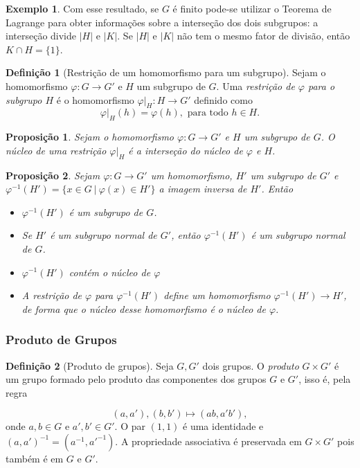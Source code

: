 \documentclass[a4paper,12pt]{report}
\theoremstyle{plain}
\newtheorem{proposicao}{Proposição}[section]
\theoremstyle{definition}
\newtheorem{definicao}{Definição}[section]
\newtheorem{exemplo}{Exemplo}[section]
\begin{document}
	\begin{exemplo}
		Com esse resultado, se \(G\) é finito pode-se utilizar o
		Teorema de Lagrange para obter informações sobre a interseção dos dois
		subgrupos: a interseção divide \(|H|\) e \(|K|\). Se \(|H|\) e \(|K|\)
		não tem o mesmo fator de divisão, então \(K\cap H = \{1\}\).	
	\end{exemplo}
	
	\begin{definicao}[Restrição de um homomorfismo para um subgrupo]
		Sejam o homomorfismo \(\varphi:G\longrightarrow G'\)
		e \(H\) um subgrupo de \(G\). Uma \emph{restrição de \(\varphi\) para o subgrupo \(H\)} é o homomorfismo \(\varphi|_H:H\longrightarrow G'\)
		definido como
		\[\varphi|_H(h) = \varphi(h), \text{ para todo }h\in H.\]	
	\end{definicao}
	
	\begin{proposicao}
		Sejam o homomorfismo
		\(\varphi:G\longrightarrow G'\) e \(H\) um subgrupo de \(G\). O núcleo
		de uma restrição \(\varphi|_H\) é a interseção do núcleo de \(\varphi\)
		e \(H\).	
	\end{proposicao}
	
	\begin{proposicao}
		 Sejam \(\varphi:G\longrightarrow G'\) um
		homomorfismo, \(H'\) um subgrupo de \(G'\) e
		\(\varphi^{-1}(H') = \{x \in G \ | \ \varphi(x) \in H'\}\) a imagem
		inversa de \(H'\). Então
		\begin{itemize}
			\item \(\varphi^{-1}(H')\) é um subgrupo de \(G\).
			\item Se \(H'\) é um subgrupo normal de \(G'\), então \(\varphi^{-1}(H')\) é
			um subgrupo normal de \(G\).
			\item \(\varphi^{-1}(H')\) contém o núcleo de \(\varphi\)
			\item A restrição de \(\varphi\) para \(\varphi^{-1}(H')\) define um
			homomorfismo \(\varphi^{-1}(H')\longrightarrow H'\), de forma que o
			núcleo desse homomorfismo é o núcleo de \(\varphi\).
		\end{itemize}
	\end{proposicao}
	
	\subsubsection{Produto de Grupos}
	
	\begin{definicao}[Produto de grupos]
		Seja \(G,G'\) dois grupos. O \emph{produto}
		\(G\times G'\) é um grupo formado pelo produto das componentes dos
		grupos \(G\) e \(G'\), isso é, pela regra
		
		\[ (a,a'), (b,b') \mapsto (ab,a'b'), \] onde \(a,b \in G\) e
		\(a',b'\in G'\). O par \((1,1)\) é uma identidade e
		\((a,a')^{-1} = (a^{-1},a'^{-1})\). A propriedade associativa é
		preservada em \(G\times G'\) pois também é em \(G\) e \(G'\).
	\end{definicao}
	
\end{document}
